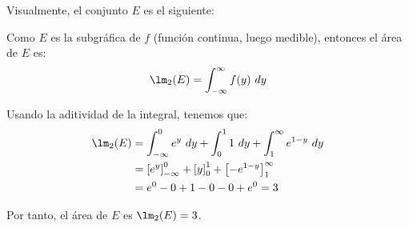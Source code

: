 \begin{ejercicio}
    Visualmente, el conjunto $E$ es el siguiente:
    \begin{figure}[H]
        \centering
    \end{figure}

    Como $E$ es la subgráfica de $f$ (función continua, luego medible), entonces el área de $E$ es:
    \begin{equation*}
        \lm_2(E) = \int_{-\infty}^{\infty} f(y)~dy
    \end{equation*}

    Usando la aditividad de la integral, tenemos que:
    \begin{align*}
        \lm_2(E) &= \int_{-\infty}^0 e^y~dy + \int_0^1 1~dy + \int_1^{\infty} e^{1-y}~dy \\
        &= \left[ e^y \right]_{-\infty}^0 + \left[ y \right]_0^1 + \left[ -e^{1-y} \right]_1^{\infty} \\
        &= e^0 - 0 + 1 - 0 - 0 + e^0 = 3
    \end{align*}

    Por tanto, el área de $E$ es $\lm_2(E) = 3$.
\end{ejercicio}

